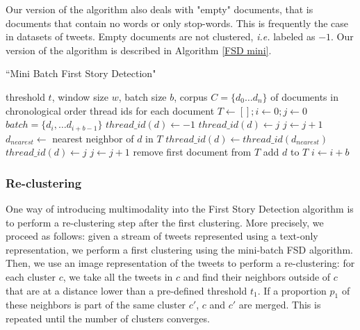 Our version of the algorithm also deals with "empty" documents, that is documents that contain no words or only stop-words. This is frequently the case in datasets of tweets. Empty documents are not clustered, \textit{i.e.} labeled as $-1$. Our version of the algorithm is described in Algorithm \ref{FSD mini}.
\begin{algorithm}
\caption{``Mini Batch First Story Detection"}
\label{FSD mini}
\begin{algorithmic}[1]
\REQUIRE threshold $t$, window size $w$, batch size $b$, corpus $C=\{d_0 \ldots d_n\}$ of documents in chronological order
\ENSURE thread ids for each document
\STATE $T \leftarrow \left[ \right] ; i \leftarrow 0  ; j \leftarrow 0 $
\STATE $batch = \{d_{i}, \ldots d_{i + b -1}\}$
    \STATE $thread\_id(d) \leftarrow -1$
    \ELSE
    \STATE $thread\_id(d) \leftarrow j$
    \STATE $j \leftarrow j+1$
    \ELSE
    \STATE $d_{nearest} \leftarrow $ nearest neighbor of $d$ in $T$
    \STATE $thread\_id(d) \leftarrow thread\_id(d_{nearest})$
    \ELSE
    \STATE $thread\_id(d) \leftarrow j$
    \STATE $j \leftarrow j+1$
    \ENDIF
    \ENDIF
    \STATE remove first document from $T$
    \ENDIF
    \ENDIF
    \STATE add $d$ to $T$
    \STATE $i \leftarrow i + b$
    \ENDFOR
\ENDWHILE
\end{algorithmic}
\end{algorithm}



\subsubsection{Re-clustering}
\label{SubSec: reclustering}
One way of introducing multimodality into the First Story Detection algorithm is to perform a re-clustering step after the first clustering. More precisely, we proceed as follows: given a stream of tweets represented using a text-only representation, we perform a first clustering using the  mini-batch FSD algorithm. Then, we use an image representation of the tweets to perform a re-clustering: for each cluster $c$, we take all the tweets in $c$ and find their neighbors outside of $c$ that are at a distance lower than a pre-defined threshold $t_1$. If a proportion $p_1$ of these neighbors is part of the same cluster $c'$, $c$ and $c'$ are merged. This is repeated until the number of clusters converges.

